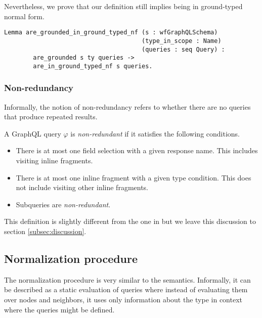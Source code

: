 Nevertheless, we prove that our definition still implies being in ground-typed normal form.

\begin{verbatim}
Lemma are_grounded_in_ground_typed_nf (s : wfGraphQLSchema)
                                      (type_in_scope : Name)
                                      (queries : seq Query) :
        are_grounded s ty queries ->
        are_in_ground_typed_nf s queries.
\end{verbatim}

\subsubsection*{Non-redundancy}

Informally, the notion of non-redundancy refers to whether there are no queries that produce repeated results.

\begin{definition}
A GraphQL query $\varphi$ is \textit{non-redundant} if it satisfies the following conditions.
\begin{itemize}
    \item There is at most one field selection with a given response name. This includes visiting inline fragments.

    \item There is at most one inline fragment with a given type condition. This does not include visiting other inline fragments.

    \item Subqueries are \textit{non-redundant}.
\end{itemize}
\end{definition}

This definition is slightly different from the one in \HP{} but we leave this discussion to section \ref{subsec:discussion}.


\subsection{Normalization procedure}\label{subsec:normalization}

The normalization procedure is very similar to the semantics. Informally, it can be described as a static evaluation of queries where instead of evaluating them over nodes and neighbors, it uses only information about the type in context where the queries might be defined.

